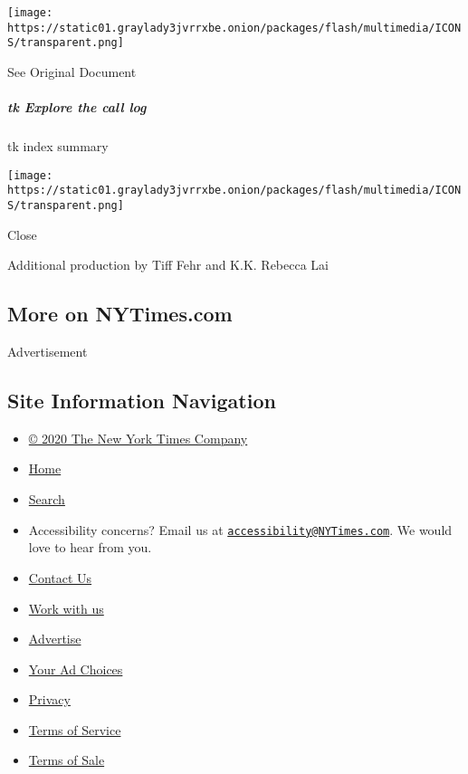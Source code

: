 \protect\hyperlink{}{}

\texttt{[image: https://static01.graylady3jvrrxbe.onion/packages/flash/multimedia/ICONS/transparent.png]}

See Original Document

\hypertarget{tk-explore-the-call-log}{%
\subparagraph{tk Explore the call log}\label{tk-explore-the-call-log}}

tk index summary

\texttt{[image: https://static01.graylady3jvrrxbe.onion/packages/flash/multimedia/ICONS/transparent.png]}

Close

Additional production by Tiff Fehr and K.K. Rebecca Lai

\hypertarget{more-on-nytimescom}{%
\subsection{More on NYTimes.com}\label{more-on-nytimescom}}

Advertisement

\hypertarget{site-information-navigation}{%
\subsection{Site Information
Navigation}\label{site-information-navigation}}

\begin{itemize}
\tightlist
\item
  \href{https://help.nytimes3xbfgragh.onion/hc/en-us/articles/115014792127-Copyright-notice}{©
  2020 The New York Times Company}
\item
  \href{https://www.nytimes3xbfgragh.onion}{Home}
\item
  \href{https://www.nytimes3xbfgragh.onion/search/}{Search}
\item
  Accessibility concerns? Email us at
  \href{mailto:accessibility@NYTimes.com}{\nolinkurl{accessibility@NYTimes.com}}.
  We would love to hear from you.
\item
  \href{https://help.nytimes3xbfgragh.onion/hc/en-us/articles/115015385887-Contact-Us}{Contact
  Us}
\item
  \href{https://www.nytco.com/careers/}{Work with us}
\item
  \href{https://nytmediakit.com/}{Advertise}
\item
  \href{https://help.nytimes3xbfgragh.onion/hc/en-us/articles/115014892108-Privacy-policy\#pp}{Your
  Ad Choices}
\item
  \href{https://help.nytimes3xbfgragh.onion/hc/en-us/articles/115014892108-Privacy-policy}{Privacy}
\item
  \href{https://help.nytimes3xbfgragh.onion/hc/en-us/articles/115014893428-Terms-of-service}{Terms
  of Service}
\item
  \href{https://help.nytimes3xbfgragh.onion/hc/en-us/articles/115014893968-Terms-of-sale}{Terms
  of Sale}
\end{itemize}

